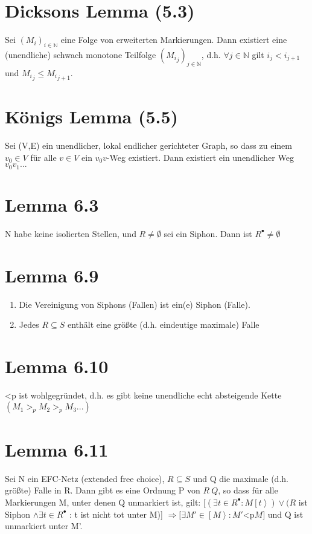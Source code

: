 \documentclass[12pt]{scrreprt}
\begin{document}
\section{Dicksons Lemma (5.3)}
Sei ${(M_i)}_{i \in \mathbb{N}}$ eine Folge von erweiterten Markierungen. Dann existiert eine (unendliche) schwach monotone Teilfolge $({M_i}_j)_{j \in \mathbb{N}}$, d.h. $\forall j \in \mathbb{N}$ gilt $i_j < i_{j+1}$ und ${M_i}_j \le {M_i}_{j+1}$.

\section{Königs Lemma (5.5)}
Sei (V,E) ein unendlicher, lokal endlicher gerichteter Graph, so dass zu einem $v_0 \in V$ für alle $v \in V$ ein $v_0 v$-Weg existiert. Dann existiert ein unendlicher Weg $v_0 v_1 ...$

\section{Lemma 6.3}
N habe keine isolierten Stellen, und $R \not = \emptyset$ sei ein Siphon. Dann ist $R^\bullet \not = \emptyset$

\section{Lemma 6.9}
\begin{enumerate}
	\item Die Vereinigung von Siphons (Fallen) ist ein(e) Siphon (Falle).
	\item Jedes $R \subseteq S$ enthält eine größte (d.h. eindeutige maximale) Falle
\end{enumerate}

\section{Lemma 6.10}
\ac{<p} ist wohlgegründet, d.h. es gibt keine unendliche echt absteigende Kette $(M_1 >_p M_2 >_p M_3 ...)$

\section{Lemma 6.11}
Sei N ein EFC-Netz (extended free choice), $R \subseteq S$ und Q die maximale (d.h. größte) Falle in R. Dann gibt es eine Ordnung P von $R \ Q$, so dass für alle Markierungen M, unter denen Q unmarkiert ist, gilt:\newline
$[(\exists t \in R^\bullet : M\left[t\right>) \vee (R$ ist Siphon $\wedge \exists t \in R^\bullet$ : t ist nicht tot unter M)] $\Rightarrow [ \exists M' \in \left[M\right> : M' $\ac{<p}$M]$ und Q ist unmarkiert unter M'.
\end{document}
